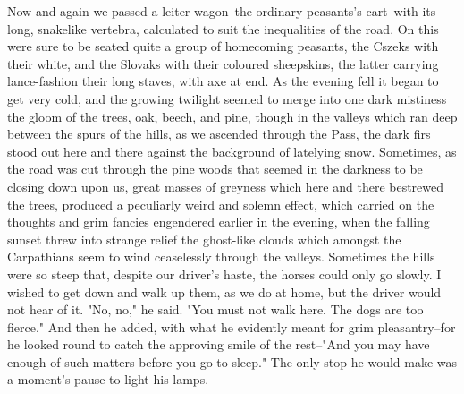 Now and again we passed a leiter-wagon--the ordinary peasants's cart--with its long, snakelike vertebra, calculated to suit the inequalities of the road. On this were sure to be seated quite a group of homecoming peasants, the Cszeks with their white, and the Slovaks with their coloured sheepskins, the latter carrying lance-fashion their long staves, with axe at end. As the evening fell it began to get very cold, and the growing twilight seemed to merge into one dark mistiness the gloom of the trees, oak, beech, and pine, though in the valleys which ran deep between the spurs of the hills, as we ascended through the Pass, the dark firs stood out here and there against the background of latelying snow. Sometimes, as the road was cut through the pine woods that seemed in the darkness to be closing down upon us, great masses of greyness which here and there bestrewed the trees, produced a peculiarly weird and solemn effect, which carried on the thoughts and grim fancies engendered earlier in the evening, when the falling sunset threw into strange relief the ghost-like clouds which amongst the Carpathians seem to wind ceaselessly through the valleys. Sometimes the hills were so steep that, despite our driver's haste, the horses could only go slowly. I wished to get down and walk up them, as we do at home, but the driver would not hear of it. "No, no," he said. "You must not walk here. The dogs are too fierce." And then he added, with what he evidently meant for grim pleasantry--for he looked round to catch the approving smile of the rest--"And you may have enough of such matters before you go to sleep." The only stop he would make was a moment's pause to light his lamps. 

